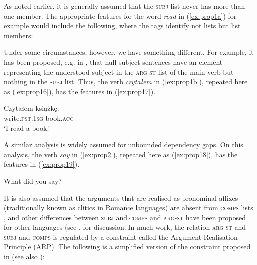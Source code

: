 \documentclass[output=paper
	        ,collection
	        ,collectionchapter
 	        ,biblatex
                ,babelshorthands
                ,newtxmath
                ,draftmode
                ,colorlinks, citecolor=brown
]{langscibook}
\begin{document}
\ea\label{ex:prop14}
\z

As noted earlier, it is generally assumed that the \textsc{subj} list never has more than one member. The appropriate features for the word \emph{read} in (\ref{ex:prop1a}) for example would include the following, where the tags identify not lists but list members:

\ea\label{ex:prop15}
\z

Under some circumstances, however, we have something different. For example, it has been proposed, e.g. in \citet[65]{ManningandSag1998}, that null subject sentences have an element representing the understood subject in the \textsc{arg-st} list of the main verb but nothing in the \textsc{subj} list. Thus, the verb \emph{czytałem} in (\ref{ex:prop1b}), repeated here as (\ref{ex:prop16}), has the features in (\ref{ex:prop17}).

\ea\label{ex:prop16}
\gll Czytałem książkę.\\
write.\textsc{pst.1sg} book.\textsc{acc}\\
\glt ‘I read a book.’

\ex\label{ex:prop17}
\z

A similar analysis is widely assumed for unbounded dependency gaps. On this analysis, the verb \emph{say} in (\ref{ex:prop2}), repeated here as (\ref{ex:prop18}), has the features in (\ref{ex:prop19}).

\ea\label{ex:prop18}
What did you say?

\ex\label{ex:prop19}
\z

It is also assumed that the arguments that are realised as pronominal affixes (traditionally known as clitics in Romance languages) are absent from \textsc{comps} lists \citep{MS97a-u,monachesi05}, and other differences between \textsc{subj} and \textsc{comps} and \textsc{arg-st} have been proposed for other languages (see \citealt{ManningandSag1998},  for discussion. In much work, the relation \textsc{arg-st} and \textsc{subj} and \textsc{comps} is regulated by a constraint called the Argument Realisation Principle (ARP). The following is a simplified version of the constraint proposed in \citet[171]{GSag2000a-u} (see also \citealt[12]{BMS2001a}):
\end{document}
